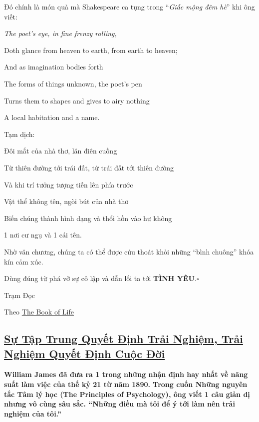 \documentclass{article}
\begin{document}
%
Đó chính là món quà mà Shakespeare ca tụng trong ``\textit{Giấc mộng đêm hè}'' khi ông viết:
\begin{center}
	\it
	The poet's eye, in fine frenzy rolling,
	
	Doth glance from heaven to earth, from earth to heaven;
	
	And as imagination bodies forth
	
	The forms of things unknown, the poet's pen
	
	Turns them to shapes and gives to airy nothing
	
	A local habitation and a name.
\end{center}
Tạm dịch:
\begin{center}
	\it
	
	Đôi mắt của nhà thơ, lăn điên cuồng
	
	Từ thiên đường tới trái đất, từ trái đất tới thiên đường
	
	Và khi trí tưởng tượng tiến lên phía trước 
	
	Vật thể không tên, ngòi bút của nhà thơ
	
	Biến chúng thành hình dạng và thổi hồn vào hư không
	
	1 nơi cư ngụ và 1 cái tên.
\end{center}
Nhờ văn chương, chúng ta có thể được cứu thoát khỏi những ``bình chuông'' khóa kín cảm xúc.

Dùng đúng từ phá vỡ sự cô lập và dẫn lối ta tới \textbf{TÌNH YÊU}.\hfill$\square$

\begin{flushright}
	Trạm Đọc
	
	Theo \href{http://www.thebookoflife.org/how-words-help-us-to-feel-things/}{The Book of Life}
\end{flushright}


\subsection{\href{http://tramdoc.vn/tin-tuc/su-tap-trung-quyet-dinh-trai-nghiem-trai-nghiem-quyet-dinh-cuoc-doi-nMOYnW.html}{Sự Tập Trung Quyết Định Trải Nghiệm, Trải Nghiệm Quyết Định Cuộc Đời}}

\textbf{William James đã đưa ra 1 trong những nhận định hay nhất về năng suất làm việc của thế kỷ 21 từ năm 1890. Trong cuốn Những nguyên tắc Tâm lý học (The Principles of Psychology), ông viết 1 câu giản dị nhưng vô cùng sâu sắc. ``Những điều mà tôi để ý tới làm nên trải nghiệm của tôi.''}
\end{document}

